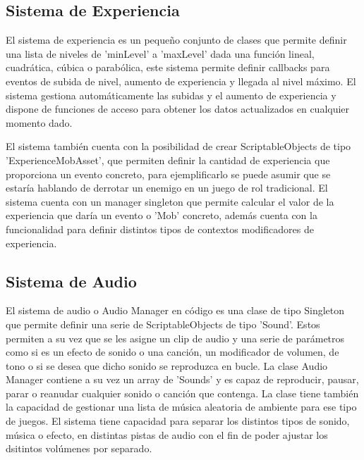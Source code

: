 \subsection{Sistema de Experiencia}
El sistema de experiencia es un pequeño conjunto de clases que permite definir una lista de niveles de 'minLevel' a 'maxLevel' dada una función lineal, cuadrática, cúbica o 
 parabólica, este sistema permite definir callbacks para eventos de subida de nivel, aumento de experiencia y llegada al nivel máximo. El sistema gestiona automáticamente las
 subidas y el aumento de experiencia y dispone de funciones de acceso para obtener los datos actualizados en cualquier momento dado.

El sistema también cuenta con la posibilidad de crear ScriptableObjects de tipo 'ExperienceMobAsset', que permiten definir la cantidad de experiencia que proporciona un evento 
 concreto, para ejemplificarlo se puede asumir que se estaría hablando de derrotar un enemigo en un juego de rol tradicional. El sistema cuenta con un manager singleton que 
 permite calcular el valor de la experiencia que daría un evento o 'Mob' concreto, además cuenta con la funcionalidad para definir distintos tipos de contextos modificadores 
 de experiencia.


\subsection{Sistema de Audio}
El sistema de audio o Audio Manager en código es una clase de tipo Singleton que permite definir una serie de ScriptableObjects de tipo 'Sound'. Estos permiten a su vez que 
se les asigne un clip de audio y una serie de parámetros como si es un efecto de sonido o una canción, un modificador de volumen, de tono o si se desea que dicho sonido 
se reproduzca en bucle. La clase Audio Manager contiene a su vez un array de 'Sounds' y es capaz de reproducir, pausar, parar o reanudar cualquier sonido o canción que contenga. 
La clase tiene también la capacidad de gestionar una lista de música aleatoria de ambiente para ese tipo de juegos. El sistema tiene capacidad para separar los distintos tipos de 
sonido, música o efecto, en distintas pistas de audio con el fin de poder ajustar los dsitintos volúmenes por separado.    

